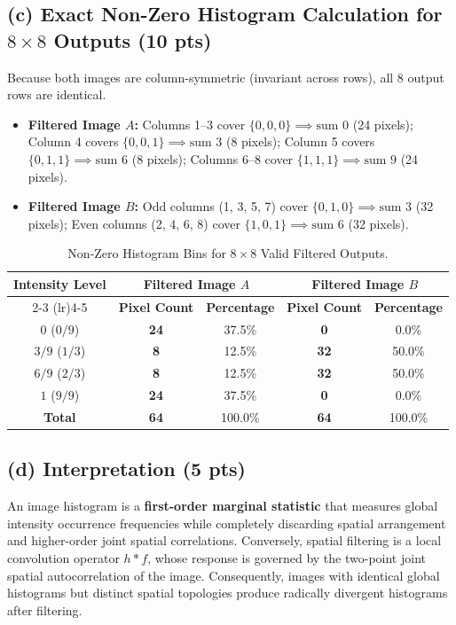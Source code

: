 \documentclass[11pt,a4paper]{article}
\begin{document}
\subsection{(c) Exact Non-Zero Histogram Calculation for \texorpdfstring{$8 \times 8$}{8 x 8} Outputs (10 pts)}
Because both images are column-symmetric (invariant across rows), all 8 output rows are identical.
\begin{itemize}
    \item \textbf{Filtered Image $A$:} Columns 1--3 cover $\{0,0,0\} \implies \text{sum } 0$ (24 pixels); Column 4 covers $\{0,0,1\} \implies \text{sum } 3$ (8 pixels); Column 5 covers $\{0,1,1\} \implies \text{sum } 6$ (8 pixels); Columns 6--8 cover $\{1,1,1\} \implies \text{sum } 9$ (24 pixels).
    \item \textbf{Filtered Image $B$:} Odd columns (1, 3, 5, 7) cover $\{0,1,0\} \implies \text{sum } 3$ (32 pixels); Even columns (2, 4, 6, 8) cover $\{1,0,1\} \implies \text{sum } 6$ (32 pixels).
\end{itemize}

\begin{table}[htbp]
\centering
\small
\caption{Non-Zero Histogram Bins for $8 \times 8$ Valid Filtered Outputs.}
\label{tab:p3_histograms}
\begin{tabular}{ccccc}
\toprule
\multirow{2}{*}{\textbf{Intensity Level}} & \multicolumn{2}{c}{\textbf{Filtered Image $A$}} & \multicolumn{2}{c}{\textbf{Filtered Image $B$}} \\
\cmidrule(lr){2-3} \cmidrule(lr){4-5}
& \textbf{Pixel Count} & \textbf{Percentage} & \textbf{Pixel Count} & \textbf{Percentage} \\
\midrule
$0$ ($0/9$)     & \textbf{24} & 37.5\% & \textbf{0}  & 0.0\%  \\
$3/9$ ($1/3$)   & \textbf{8}  & 12.5\% & \textbf{32} & 50.0\% \\
$6/9$ ($2/3$)   & \textbf{8}  & 12.5\% & \textbf{32} & 50.0\% \\
$1$ ($9/9$)     & \textbf{24} & 37.5\% & \textbf{0}  & 0.0\%  \\
\midrule
\textbf{Total}  & \textbf{64} & 100.0\% & \textbf{64} & 100.0\% \\
\bottomrule
\end{tabular}
\end{table}

\subsection{(d) Interpretation (5 pts)}
An image histogram is a \textbf{first-order marginal statistic} that measures global intensity occurrence frequencies while completely discarding spatial arrangement and higher-order joint spatial correlations. Conversely, spatial filtering is a local convolution operator $h * f$, whose response is governed by the two-point joint spatial autocorrelation of the image. Consequently, images with identical global histograms but distinct spatial topologies produce radically divergent histograms after filtering.
\end{document}
